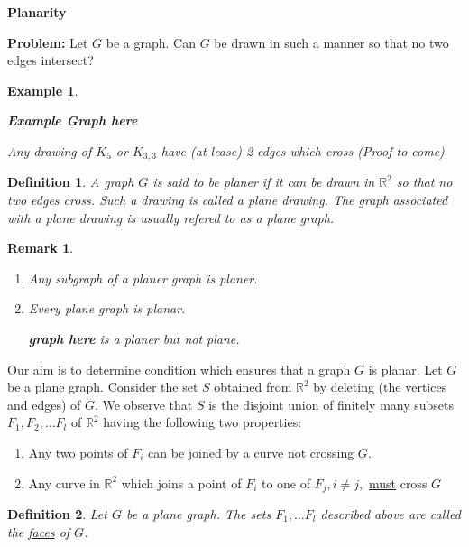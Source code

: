 \documentclass[12pt]{article}
\newtheorem{example}{Example}
\newtheorem{definition}{Definition}
\newtheorem*{remark}{Remark}
\begin{document}
\textbf{Planarity}

\textbf{Problem:} Let $G$ be a graph. Can $G$ be drawn in such a manner so that no two edges intersect?


\begin{example}


  \begin{enumerate}
          \textbf{Example Graph here}
  \end{enumerate}

  Any drawing of $K_{5}$ or $K_{3,3}$ have (at lease) 2 edges which cross (Proof to come)
\end{example}


\begin{definition}
  A graph $G$ is said to be planer if it can be drawn in $\mathbb{R}^{2}$ so that no two edges cross. Such a drawing is called a plane drawing. The graph associated with a plane drawing is usually refered to as a plane graph.
\end{definition}

\begin{remark}

  \begin{enumerate}
    \item Any subgraph of a planer graph is planer.
    \item Every plane graph is planar.

          \textbf{graph here}
         is a planer but not plane.
  \end{enumerate}

\end{remark}


Our aim is to determine condition which ensures that a graph $G$ is planar. Let $G$ be a plane graph. Consider the set $S$ obtained from $\mathbb{R}^{2}$ by deleting (the vertices and edges) of $G$.
We observe that $S$ is the disjoint union of finitely many subsets $F_{1}, F_{2},\dots F_{l}$ of $\mathbb{R}^{2}$ having the following two properties:

\begin{enumerate}
  \item Any two points of $F_{i}$ can be joined by a curve not crossing $G$.
        \item Any curve in $\mathbb{R}^{2}$ which joins a point of $F_{i}$ to one of $F_{j}, i\neq j, $ \underline{must} cross $G$
\end{enumerate}


\begin{definition}
Let $G$ be a plane graph. The sets $F_{1}, \dots F_{l}$ described above are called the \underline{faces} of $G$.
\end{definition}
\end{document}
